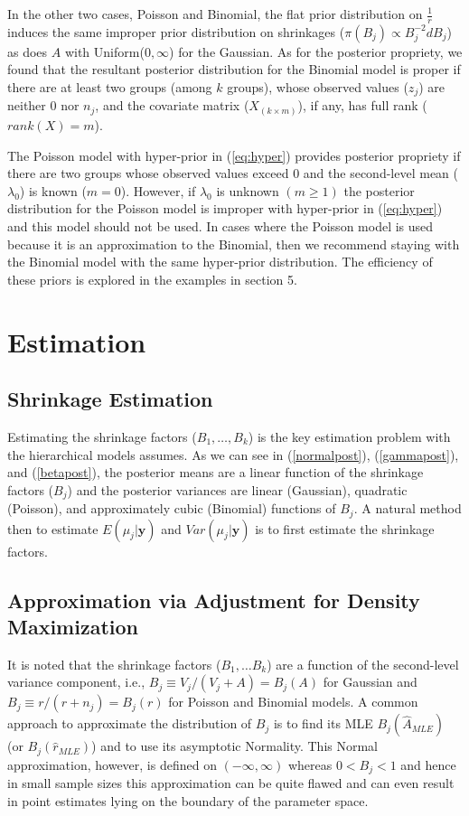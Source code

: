 \documentclass[article]{jss}
\begin{document}
In the other two cases, Poisson and Binomial, the flat prior distribution on $\frac{1}{r}$ induces the same improper prior distribution on shrinkages ($\pi(B_{j})\propto B_{j}^{-2} d B_j$) as does $A$ with Uniform($0, \infty$) for the Gaussian. As for the posterior propriety, we found that the resultant posterior distribution for the Binomial model is proper if there are at least two groups (among $k$ groups), whose observed values ($z_{j}$) are neither 0 nor $n_j$,  and the covariate matrix ($X_{(k\times m )}$), if any,  has full rank ($rank(X)=m$). 


The Poisson model with hyper-prior in (\ref{eq:hyper}) provides posterior propriety if there are two groups whose observed values exceed 0 and the second-level mean ($\lambda_0$) is known ($m=0$). However, if $\lambda_0$ is unknown $(m \geq 1)$ the posterior distribution for the Poisson model is improper with hyper-prior in (\ref{eq:hyper}) and this model should not be used. In cases where the Poisson model is used because it is an approximation to the Binomial, then we recommend staying with the Binomial model with the same hyper-prior distribution. The efficiency of these priors is explored in the examples in section 5.



\section[Estimation]{Estimation}

\subsection[Shrinkage Estimation]{Shrinkage Estimation}
Estimating the shrinkage factors ($B_1, \ldots, B_k$) is the key estimation problem with the hierarchical models  assumes. As we can see in (\ref{normalpost}), (\ref{gammapost}), and (\ref{betapost}), the posterior means are a linear function of the shrinkage factors ($B_{j}$) and the posterior variances are linear (Gaussian), quadratic (Poisson), and  approximately cubic (Binomial) functions of $B_{j}$. A natural method then to estimate $E(\mu_{j}\vert \textbf{y})$ and $Var(\mu_{j}\vert \textbf{y})$ is to first estimate the shrinkage factors.

\subsection[ADM]{Approximation via Adjustment for Density Maximization}\label{ADM}
It is noted that the shrinkage factors ($B_1, \ldots B_k$) are a function of the second-level variance component, i.e., $B_{j}\equiv V_{j}/(V_{j}+A)=B_{j}(A)$ for Gaussian and $B_{j}\equiv r/(r+n_{j})=B_{j}(r)$ for Poisson and Binomial models. A common approach to approximate the distribution of $B_{j}$ is to find its MLE $B_{j}(\hat{A}_{MLE})$ (or  $B_{j}(\hat{r}_{MLE})$) and to use its asymptotic Normality. This Normal approximation, however, is defined on $(-\infty, \infty)$ whereas $0 < B_{j} < 1$ and hence in small sample sizes this approximation can be quite flawed and can even result in point estimates lying on the boundary of the parameter space.
\end{document}
